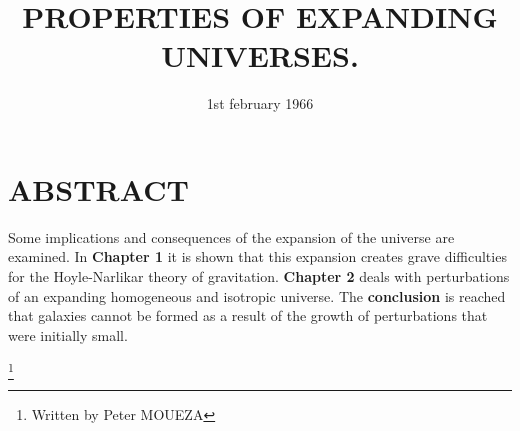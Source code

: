 \documentclass{article}
\title{\textbf{PROPERTIES OF EXPANDING UNIVERSES.}}
\date{1st february 1966}
\begin{document}



\part{\textbf{ABSTRACT}}


Some implications and consequences of the expansion of the universe are examined. In \textbf{Chapter 1} it is shown that this expansion creates grave difficulties for the Hoyle-Narlikar theory of gravitation. \textbf{Chapter 2} deals with perturbations of an expanding homogeneous and isotropic universe. The \textbf{conclusion} is reached that galaxies cannot be formed as a result of the growth of perturbations that were initially small.




\footnote{Written by Peter MOUEZA}
\end{document}
